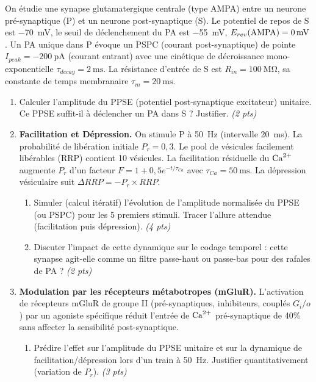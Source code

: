 \documentclass[11pt]{article}
\begin{document}
\begin{exercice}
On étudie une synapse glutamatergique centrale (type AMPA) entre un neurone pré-synaptique (P) et un neurone post-synaptique (S). Le potentiel de repos de S est \SI{-70}{\milli\volt}, le seuil de déclenchement du PA est \SI{-55}{\milli\volt}, $E_{rev}(\ce{AMPA}) = \SI{0}{\milli\volt}$. Un PA unique dans P évoque un PSPC (courant post-synaptique) de pointe $I_{peak} = \SI{-200}{\pico\ampere}$ (courant entrant) avec une cinétique de décroissance mono-exponentielle $\tau_{decay} = \SI{2}{\milli\second}$. La résistance d'entrée de S est $R_{in} = \SI{100}{\mega\ohm}$, sa constante de temps membranaire $\tau_m = \SI{20}{\milli\second}$.

\begin{enumerate}
    \item Calculer l'amplitude du PPSE (potentiel post-synaptique excitateur) unitaire. Ce PPSE suffit-il à déclencher un PA dans S ? Justifier. \textit{(2 pts)}
    \item \textbf{Facilitation et Dépression.} On stimule P à \SI{50}{\hertz} (intervalle \SI{20}{\milli\second}). La probabilité de libération initiale $P_r = 0,3$. Le pool de vésicules facilement libérables (RRP) contient 10 vésicules. La facilitation résiduelle du $\ce{Ca^{2+}}$ augmente $P_r$ d'un facteur $F = 1 + 0,5 e^{-t/\tau_{Ca}}$ avec $\tau_{Ca} = \SI{50}{\milli\second}$. La dépression vésiculaire suit $\Delta RRP = -P_r \times RRP$.
    \begin{enumerate}
        \item Simuler (calcul itératif) l'évolution de l'amplitude normalisée du PPSE (ou PSPC) pour les 5 premiers stimuli. Tracer l'allure attendue (facilitation puis dépression). \textit{(4 pts)}
        \item Discuter l'impact de cette dynamique sur le codage temporel : cette synapse agit-elle comme un filtre passe-haut ou passe-bas pour des rafales de PA ? \textit{(2 pts)}
    \end{enumerate}
    \item \textbf{Modulation par les récepteurs métabotropes (mGluR).} L'activation de récepteurs mGluR de groupe II (pré-synaptiques, inhibiteurs, couplés $G_i/o$) par un agoniste spécifique réduit l'entrée de $\ce{Ca^{2+}}$ pré-synaptique de 40\% sans affecter la sensibilité post-synaptique.
    \begin{enumerate}
        \item Prédire l'effet sur l'amplitude du PPSE unitaire et sur la dynamique de facilitation/dépression lors d'un train à \SI{50}{\hertz}. Justifier quantitativement (variation de $P_r$). \textit{(3 pts)}

\end{enumerate}
\end{enumerate}
\end{exercice}
\end{document}
